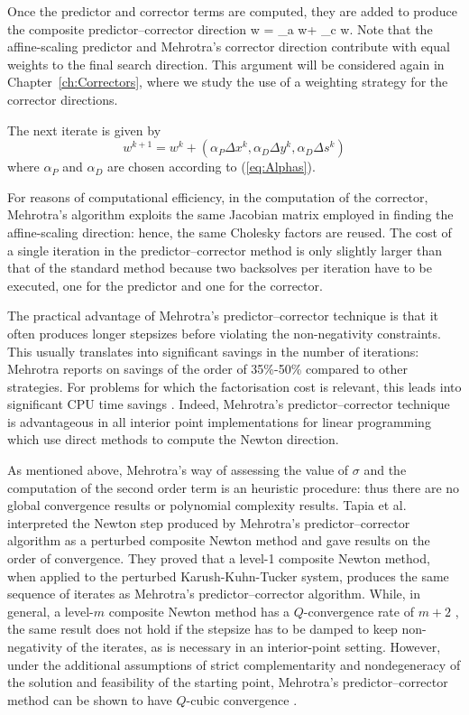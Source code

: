 Once the predictor and corrector terms are computed, they are 
added to produce the composite predictor--corrector direction
\be \label{eq:CompositeDirection}
\Delta w = \Delta_a w+ \Delta_c w.
\ee
Note that the affine-scaling predictor and Mehrotra's corrector direction 
contribute with equal weights to the final search direction. 
This argument will be considered again in Chapter~\ref{ch:Correctors}, 
where we study the use of a weighting strategy for the corrector
directions.

The next iterate is given by
\[
w^{k+1} = w^k
        + (\alpha_P\Delta x^k,\alpha_D\Delta y^k,\alpha_D\Delta s^k)
\]
where $\alpha_P$ and $\alpha_D$ are chosen according to (\ref{eq:Alphas}).

For reasons of computational efficiency, in the computation of
the corrector, Mehrotra's algorithm exploits 
the same Jacobian matrix employed in finding the affine-scaling direction: 
hence, the same Cholesky factors are reused.
The cost of a single iteration in the predictor--corrector 
method is only slightly larger than that of the standard 
method because two backsolves per iteration have to be executed, 
one for the predictor and one for the corrector. 

The practical advantage of Mehrotra's predictor--corrector technique
is that it often produces longer stepsizes before violating the 
non-negativity constraints.
%
This usually translates into significant savings in the number of 
iterations: Mehrotra \cite{Mehrotra92} reports on savings of the
order of 35\%-50\% compared to other strategies.
For problems for which the factorisation cost is relevant, this
leads into significant 
CPU time savings \cite{LustigMarstenShanno,Mehrotra92}. Indeed, 
Mehrotra's predictor--corrector technique is advantageous in all 
interior point implementations for linear programming 
which use direct methods to compute 
the Newton direction.


As mentioned above, Mehrotra's way of assessing the value of $\sigma$
and the computation of the second order term is an heuristic procedure: 
thus there are 
no global convergence results or polynomial complexity results. 
Tapia et al. \cite{TapiaZhangSaltzmanWeiser} interpreted the Newton step 
produced by Mehrotra's predictor--corrector algorithm as a perturbed
composite Newton method and gave results on the order of convergence. 
They proved that a level-1 composite Newton method, when applied 
to the perturbed Karush-Kuhn-Tucker system, produces the same 
sequence of iterates as Mehrotra's predictor--corrector algorithm. 
While, in general, a level-$m$ composite Newton method has 
a $Q$-convergence rate of $m+2$ \cite{OrtegaRheinboldt},
the same result does not hold 
if the stepsize has to be damped to keep non-negativity of the iterates, 
as is necessary in an interior-point setting. However, under 
the additional assumptions of strict complementarity and nondegeneracy 
of the solution and feasibility of the starting point, Mehrotra's 
predictor--corrector method can be shown to have $Q$-cubic convergence
\cite{TapiaZhangSaltzmanWeiser}.


